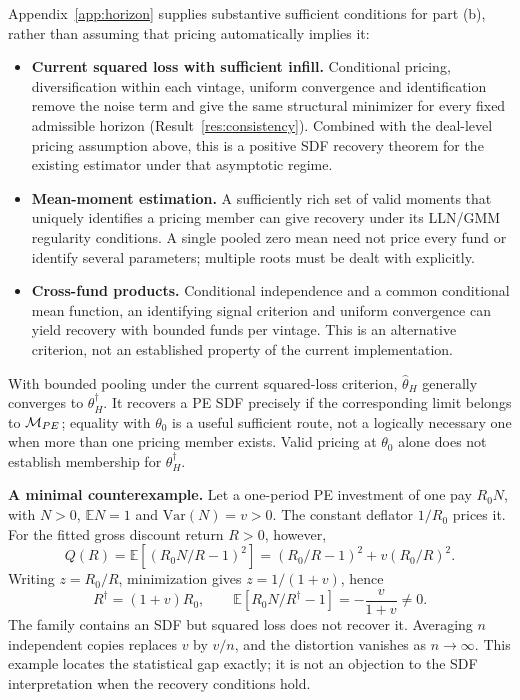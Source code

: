\documentclass[11pt]{article}
\newcommand{\E}{\mathbb{E}}
\newcommand{\Var}{\mathrm{Var}}
\theoremstyle{plain}
\theoremstyle{definition}
\begin{document}
Appendix~\ref{app:horizon} supplies substantive sufficient conditions for part (b), rather than assuming that pricing automatically implies it:
\begin{itemize}
\item \textbf{Current squared loss with sufficient infill.} Conditional pricing, diversification within each vintage, uniform convergence and identification remove the noise term and give the same structural minimizer for every fixed admissible horizon (Result~\ref{res:consistency}). Combined with the deal-level pricing assumption above, this is a positive SDF recovery theorem for the existing estimator under that asymptotic regime.
\item \textbf{Mean-moment estimation.} A sufficiently rich set of valid moments that uniquely identifies a pricing member can give recovery under its LLN/GMM regularity conditions. A single pooled zero mean need not price every fund or identify several parameters; multiple roots must be dealt with explicitly.
\item \textbf{Cross-fund products.} Conditional independence and a common conditional mean function, an identifying signal criterion and uniform convergence can yield recovery with bounded funds per vintage. This is an alternative criterion, not an established property of the current implementation.
\end{itemize}

With bounded pooling under the current squared-loss criterion, $\hat\theta_H$ generally converges to $\theta_H^\dagger$. It recovers a PE SDF precisely if the corresponding limit belongs to $\mathcal{M}_{PE}$; equality with $\theta_0$ is a useful sufficient route, not a logically necessary one when more than one pricing member exists. Valid pricing at $\theta_0$ alone does not establish membership for $\theta_H^\dagger$.

\textbf{A minimal counterexample.} Let a one-period PE investment of one pay $R_0N$, with $N>0$, $\E N=1$ and $\Var(N)=v>0$. The constant deflator $1/R_0$ prices it. For the fitted gross discount return $R>0$, however,
\[
Q(R)=\E[(R_0N/R-1)^2]
=(R_0/R-1)^2+v(R_0/R)^2.
\]
Writing $z=R_0/R$, minimization gives $z=1/(1+v)$, hence
\[
R^\dagger=(1+v)R_0,\qquad
\E[R_0N/R^\dagger-1]=-\frac{v}{1+v}\ne0.
\]
The family contains an SDF but squared loss does not recover it. Averaging $n$ independent copies replaces $v$ by $v/n$, and the distortion vanishes as $n\to\infty$. This example locates the statistical gap exactly; it is not an objection to the SDF interpretation when the recovery conditions hold.
\end{document}
